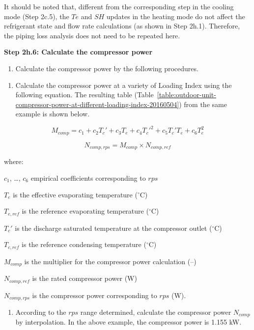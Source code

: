 It should be noted that, different from the corresponding step in the cooling mode (Step 2c.5), the \(Te\) and \(SH\) updates in the heating mode do not affect the refrigerant state and flow rate calculations (as shown in Step 2h.1). Therefore, the piping loss analysis does not need to be repeated here.

\textbf{Step 2h.6: Calculate the compressor power}

\begin{enumerate}
\def\labelenumi{(\arabic{enumi})}
\tightlist
\item
  Calculate the compressor power by the following procedures.
\end{enumerate}

\begin{enumerate}
\def\labelenumi{\alph{enumi}.}
\tightlist
\item
  Calculate the compressor power at a variety of Loading Index using the following equation. The resulting table (Table~\ref{table:outdoor-unit-compressor-power-at-different-loading-index-20160504}) from the same example is shown below.
\end{enumerate}

\begin{equation}
  M_{comp} = c_1+c_2{T_c}'+c_3T_e+c_4{T_c}'^2+c_5{T_c}'T_e+c_6T_e^2
\end{equation}

\begin{equation}
  N_{comp,rps} = M_{comp} \times N_{comp,ref}
\end{equation}

where:

\(c_1\), \ldots{}, \(c_6\) empirical coefficients corresponding to \(rps\)

\(T_e\) is the effective evaporating temperature (\(^{\circ}\)C)

\(T_{e,ref}\) is the reference evaporating temperature (\(^{\circ}\)C)

\({T_c}'\) is the discharge saturated temperature at the compressor outlet (\(^{\circ}\)C)

\(T_{c,ref}\) is the reference condensing temperature (\(^{\circ}\)C)

\(M_{comp}\) is the multiplier for the compressor power calculation (--)

\(N_{comp,ref}\) is the rated compressor power (W)

\(N_{comp,rps}\) is the compressor power corresponding to \(rps\) (W).

\begin{enumerate}
\def\labelenumi{\alph{enumi}.}
\setcounter{enumi}{1}
\tightlist
\item
  According to the \(rps\) range determined, calculate the compressor power \(N_{comp}\) by interpolation. In the above example, the compressor power is 1.155 kW.
\end{enumerate}

